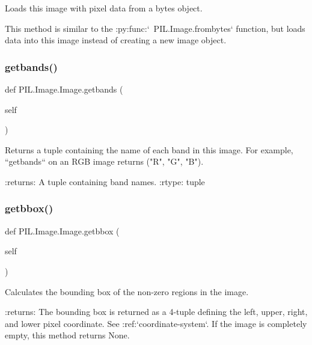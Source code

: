 \begin{DoxyVerb}Loads this image with pixel data from a bytes object.

This method is similar to the :py:func:`~PIL.Image.frombytes` function,
but loads data into this image instead of creating a new image object.
\end{DoxyVerb}
 \mbox{\label{classPIL_1_1Image_1_1Image_aa0a9151b9412ac2b662e40369b88a6b3}} 
\subsubsection{\texorpdfstring{getbands()}{getbands()}}
{\footnotesize\ttfamily def P\+I\+L.\+Image.\+Image.\+getbands (\begin{DoxyParamCaption}\item[{}]{self }\end{DoxyParamCaption})}

\begin{DoxyVerb}Returns a tuple containing the name of each band in this image.
For example, ``getbands`` on an RGB image returns ("R", "G", "B").

:returns: A tuple containing band names.
:rtype: tuple
\end{DoxyVerb}
 \mbox{\label{classPIL_1_1Image_1_1Image_ae7fcd05b874e605660cc933679b552c0}} 
\subsubsection{\texorpdfstring{getbbox()}{getbbox()}}
{\footnotesize\ttfamily def P\+I\+L.\+Image.\+Image.\+getbbox (\begin{DoxyParamCaption}\item[{}]{self }\end{DoxyParamCaption})}

\begin{DoxyVerb}Calculates the bounding box of the non-zero regions in the
image.

:returns: The bounding box is returned as a 4-tuple defining the
   left, upper, right, and lower pixel coordinate. See
   :ref:`coordinate-system`. If the image is completely empty, this
   method returns None.\end{DoxyVerb}
 \mbox{\label{classPIL_1_1Image_1_1Image_a35d92bb4697d43598424980392165907}} 
